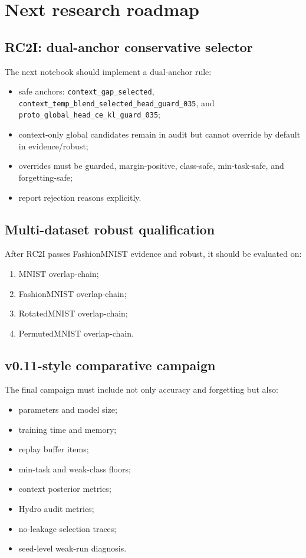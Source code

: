 \documentclass[11pt]{article}
\begin{document}
\section{Next research roadmap}

\subsection{RC2I: dual-anchor conservative selector}

The next notebook should implement a dual-anchor rule:
\begin{itemize}[leftmargin=*]
  \item safe anchors: \texttt{context\_gap\_selected}, \texttt{context\_temp\_blend\_selected\_head\_guard\_035}, and \texttt{proto\_global\_head\_ce\_kl\_guard\_035};
  \item context-only global candidates remain in audit but cannot override by default in evidence/robust;
  \item overrides must be guarded, margin-positive, class-safe, min-task-safe, and forgetting-safe;
  \item report rejection reasons explicitly.
\end{itemize}

\subsection{Multi-dataset robust qualification}

After RC2I passes FashionMNIST evidence and robust, it should be evaluated on:
\begin{enumerate}[leftmargin=*]
  \item MNIST overlap-chain;
  \item FashionMNIST overlap-chain;
  \item RotatedMNIST overlap-chain;
  \item PermutedMNIST overlap-chain.
\end{enumerate}

\subsection{v0.11-style comparative campaign}

The final campaign must include not only accuracy and forgetting but also:
\begin{itemize}[leftmargin=*]
  \item parameters and model size;
  \item training time and memory;
  \item replay buffer items;
  \item min-task and weak-class floors;
  \item context posterior metrics;
  \item Hydro audit metrics;
  \item no-leakage selection traces;
  \item seed-level weak-run diagnosis.
\end{itemize}
\end{document}
